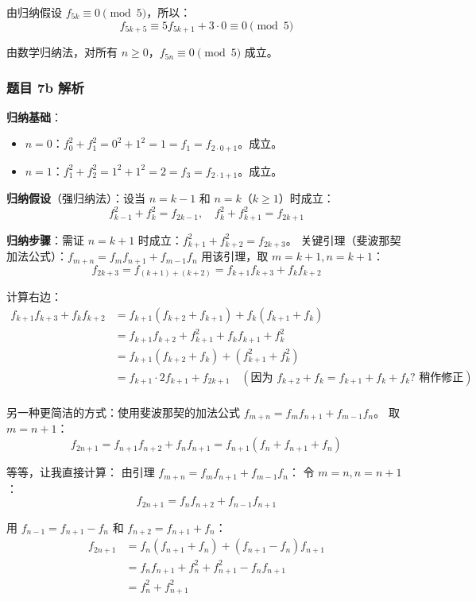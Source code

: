 \documentclass[10pt,a4paper,openany]{ctexbook}
\theoremstyle{definition}
\theoremstyle{remark}
\begin{document}
由归纳假设 $f_{5k} \equiv 0 \pmod{5}$，所以：
\[
f_{5k+5} \equiv 5f_{5k+1} + 3 \cdot 0 \equiv 0 \pmod{5}
\]

由数学归纳法，对所有 $n \ge 0$，$f_{5n} \equiv 0 \pmod{5}$ 成立。
\vspace{-2pt}

\subsubsection{题目 7b 解析}

\textbf{归纳基础}：
\begin{itemize}
\item $n = 0$：$f_0^2 + f_1^2 = 0^2 + 1^2 = 1 = f_1 = f_{2\cdot0+1}$。成立。
\item $n = 1$：$f_1^2 + f_2^2 = 1^2 + 1^2 = 2 = f_3 = f_{2\cdot1+1}$。成立。

\end{itemize}

\textbf{归纳假设}（强归纳法）：设当 $n = k-1$ 和 $n = k$（$k \ge 1$）时成立：
\[
f_{k-1}^2 + f_k^2 = f_{2k-1}, \quad f_k^2 + f_{k+1}^2 = f_{2k+1}
\]

\textbf{归纳步骤}：需证 $n = k+1$ 时成立：$f_{k+1}^2 + f_{k+2}^2 = f_{2k+3}$。
关键引理（斐波那契加法公式）：$f_{m+n} = f_m f_{n+1} + f_{m-1} f_n$
用该引理，取 $m = k+1, n = k+1$：
\[
f_{2k+3} = f_{(k+1)+(k+2)} = f_{k+1}f_{k+3} + f_k f_{k+2}
\]

计算右边：
\[
\begin{aligned}
f_{k+1}f_{k+3} + f_k f_{k+2}
&= f_{k+1}(f_{k+2} + f_{k+1}) + f_k(f_{k+1} + f_k) \\
&= f_{k+1}f_{k+2} + f_{k+1}^2 + f_k f_{k+1} + f_k^2 \\
&= f_{k+1}(f_{k+2} + f_k) + (f_{k+1}^2 + f_k^2) \\
&= f_{k+1} \cdot 2f_{k+1} + f_{2k+1} \quad (\text{因为 } f_{k+2} + f_k = f_{k+1} + f_k + f_k? \text{ 稍作修正})\\
\end{aligned}
\]

另一种更简洁的方式：使用斐波那契的加法公式 $f_{m+n} = f_m f_{n+1} + f_{m-1} f_n$。
取 $m = n+1$：
\[
f_{2n+1} = f_{n+1}f_{n+2} + f_n f_{n+1} = f_{n+1}(f_n + f_{n+1} + f_n) 
\]

等等，让我直接计算：
由引理 $f_{m+n} = f_m f_{n+1} + f_{m-1} f_n$：
令 $m = n, n = n+1$：
\[
f_{2n+1} = f_n f_{n+2} + f_{n-1} f_{n+1}
\]

用 $f_{n-1} = f_{n+1} - f_n$ 和 $f_{n+2} = f_{n+1} + f_n$：
\[
\begin{aligned}
f_{2n+1} &= f_n(f_{n+1} + f_n) + (f_{n+1} - f_n)f_{n+1} \\
&= f_n f_{n+1} + f_n^2 + f_{n+1}^2 - f_n f_{n+1} \\
&= f_n^2 + f_{n+1}^2
\end{aligned}
\]
\end{document}
